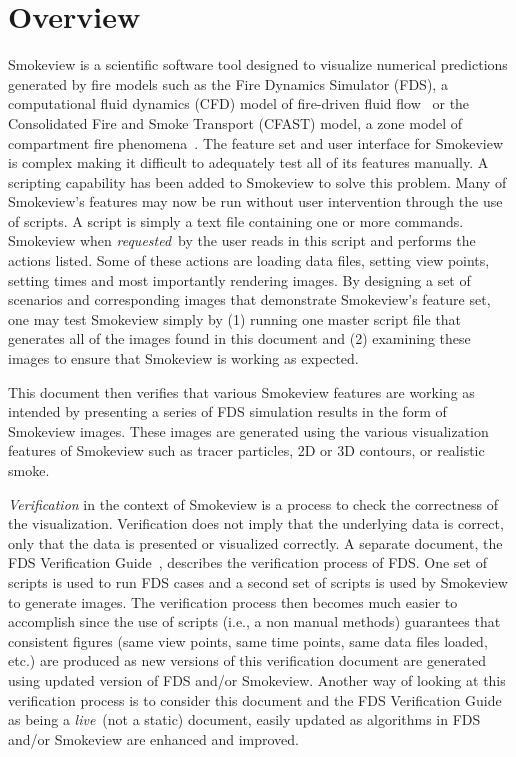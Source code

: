 \documentclass[11pt,twoside]{book}
\begin{document}
\chapter{Overview}
Smokeview is a scientific software tool designed to visualize
numerical predictions generated by fire models such as the Fire
Dynamics Simulator (FDS), a computational fluid dynamics (CFD)
model of fire-driven fluid
flow~\cite{FDS_Math_Guide,FDS_Users_Guide} or the Consolidated
Fire and Smoke Transport (CFAST) model, a zone model of
compartment fire phenomena~\cite{Jones:2004A}. The feature set and
user interface for Smokeview is complex making it difficult to
adequately test all of its features manually.  A scripting
capability has been added to Smokeview to solve this problem. Many
of Smokeview's features may now be run without user intervention
through the use of scripts.  A script is simply a text file
containing one or more commands.  Smokeview when {\em requested}\
by the user reads in this script and performs the actions listed.
Some of these actions are loading data files, setting view points,
setting times and most importantly rendering images.  By designing
a set of scenarios and corresponding images that demonstrate
Smokeview's feature set, one may test Smokeview simply by (1)
running one master script file that generates all of the images
found in this document and (2) examining these images to ensure
that Smokeview is working as expected.

This document then verifies that various Smokeview features are
working as intended by presenting a series of  FDS simulation
results in the form of Smokeview images.  These images are
generated using the various visualization features of Smokeview
such as tracer particles, 2D or 3D contours, or realistic smoke.

{\em Verification} in the context of Smokeview is a process to
check the correctness of the visualization.  Verification does not
imply that the underlying data is correct, only that the data is
presented or visualized correctly. A separate document,
the FDS Verification Guide~\cite{FDS_Verification_Guide}, describes the verification process of
FDS.  One set of scripts is used to run FDS cases and a second set
of scripts is used by Smokeview to generate images.  The
verification process then becomes much easier to accomplish since
the use of scripts (i.e., a non manual methods) guarantees that
consistent figures (same view points, same time points, same data
files loaded, etc.) are produced as new versions of this
verification document are generated using updated version of FDS
and/or Smokeview.  Another way of looking at this verification
process is to consider this document and the FDS Verification
Guide~\cite{FDS_Verification_Guide} as being a {\em live}\ (not
a static) document, easily updated as algorithms in FDS and/or
Smokeview are enhanced and improved.
\end{document}
